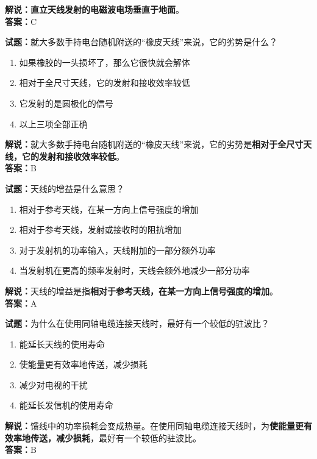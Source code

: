 \documentclass{ctexbook}
\begin{document}
\noindent\textbf{解说：}\textbf{直立天线发射的电磁波电场垂直于地面}。\\\noindent\textbf{答案：}C


\bigskip


\noindent\textbf{试题：}就大多数手持电台随机附送的“橡皮天线”来说，它的劣势是什么？

\begin{enumerate}[leftmargin=3em]
	\item 如果橡胶的一头损坏了，那么它很快就会解体
	\item 相对于全尺寸天线，它的发射和接收效率较低
	\item 它发射的是圆极化的信号
	\item 以上三项全部正确
\end{enumerate}

\noindent\textbf{解说：}就大多数手持电台随机附送的“橡皮天线”来说，它的劣势是\textbf{相对于全尺寸天线，它的发射和接收效率较低}。\\\noindent\textbf{答案：}B


\bigskip


\noindent\textbf{试题：}天线的增益是什么意思？

\begin{enumerate}[leftmargin=3em]
	\item 相对于参考天线，在某一方向上信号强度的增加
	\item 相对于参考天线，发射或接收时的阻抗增加
	\item 对于发射机的功率输入，天线附加的一部分额外功率
	\item 当发射机在更高的频率发射时，天线会额外地减少一部分功率
\end{enumerate}

\noindent\textbf{解说：}天线的增益是指\textbf{相对于参考天线，在某一方向上信号强度的增加}。\\\noindent\textbf{答案：}A


\bigskip


\noindent\textbf{试题：}为什么在使用同轴电缆连接天线时，最好有一个较低的驻波比？

\begin{enumerate}[leftmargin=3em]
	\item 能延长天线的使用寿命
	\item 使能量更有效率地传送，减少损耗
	\item 减少对电视的干扰
	\item 能延长发信机的使用寿命
\end{enumerate}

\noindent\textbf{解说：}馈线中的功率损耗会变成热量。在使用同轴电缆连接天线时，为\textbf{使能量更有效率地传送，减少损耗}，最好有一个较低的驻波比。\\\noindent\textbf{答案：}B
\end{document}
